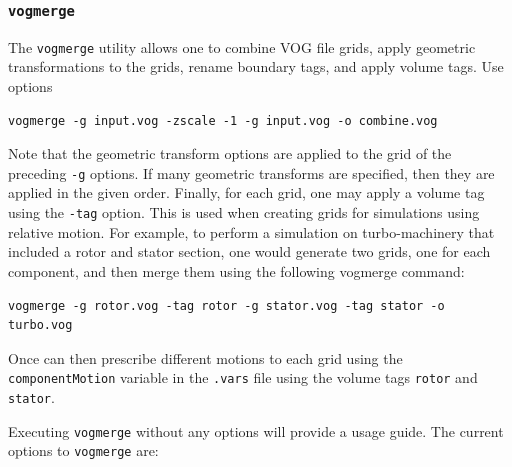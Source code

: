 \documentclass{article}
\begin{document}
\subsubsection{\tt vogmerge}

The {\tt vogmerge} utility allows one to combine VOG file grids, apply
geometric transformations to the grids, rename boundary tags, and
apply volume tags.  Use options 

\begin{verbatim}
vogmerge -g input.vog -zscale -1 -g input.vog -o combine.vog
\end{verbatim}

Note that the geometric transform options are applied to the grid of
the preceding {\tt -g} options.  If many geometric transforms are
specified, then they are applied in the given order.  Finally, for
each grid, one may apply a volume tag using the {\tt -tag} option.
This is used when creating grids for simulations using relative
motion.  For example, to perform a simulation on turbo-machinery that included a rotor and stator section, one would generate two grids, one for each component, and then merge them using the following vogmerge command:
\begin{verbatim}
vogmerge -g rotor.vog -tag rotor -g stator.vog -tag stator -o turbo.vog
\end{verbatim}
Once can then prescribe different motions to each grid using the {\tt
  componentMotion} variable in the {\tt .vars} file using the volume tags
{\tt rotor} and {\tt stator}.

Executing {\tt vogmerge} without any options will provide a usage guide.
The current options to {\tt vogmerge} are:
\end{document}
